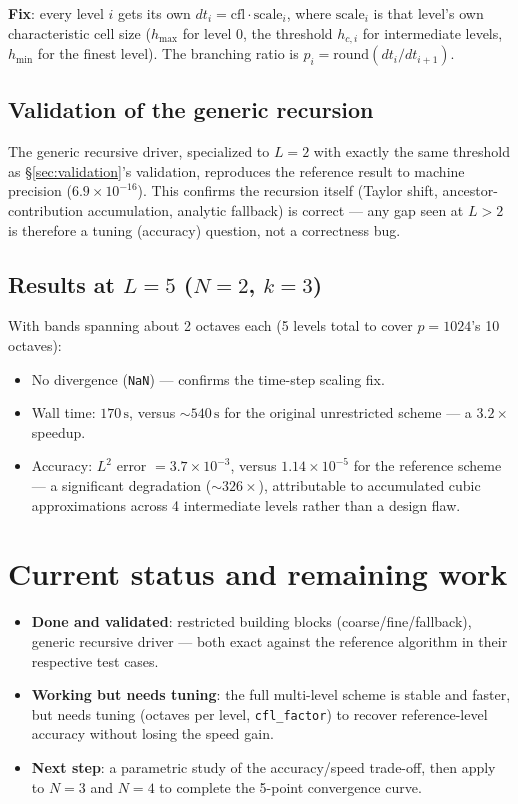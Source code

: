 \documentclass[11pt]{article}
\newcommand{\code}[1]{\texttt{#1}}
\begin{document}
\textbf{Fix}: every level $i$ gets its own $dt_i = \mathrm{cfl} \cdot
\mathrm{scale}_i$, where $\mathrm{scale}_i$ is that level's own
characteristic cell size ($h_{\max}$ for level 0, the threshold
$h_{c,i}$ for intermediate levels, $h_{\min}$ for the finest level). The
branching ratio is $p_i = \mathrm{round}(dt_i / dt_{i+1})$.

\subsection{Validation of the generic recursion}

The generic recursive driver, specialized to $L=2$ with exactly the same
threshold as \S\ref{sec:validation}'s validation, reproduces the
reference result to machine precision ($6.9\times 10^{-16}$). This
confirms the recursion itself (Taylor shift, ancestor-contribution
accumulation, analytic fallback) is correct --- any gap seen at $L>2$ is
therefore a tuning (accuracy) question, not a correctness bug.

\subsection{Results at $L=5$ ($N=2$, $k=3$)}

With bands spanning about 2 octaves each (5 levels total to cover
$p=1024$'s 10 octaves):
\begin{itemize}
  \item No divergence (\code{NaN}) --- confirms the time-step scaling
  fix.
  \item Wall time: $170\,\mathrm{s}$, versus $\sim 540\,\mathrm{s}$ for
  the original unrestricted scheme --- a $3.2\times$ speedup.
  \item Accuracy: $L^2$ error $= 3.7\times 10^{-3}$, versus
  $1.14\times 10^{-5}$ for the reference scheme --- a significant
  degradation ($\sim 326\times$), attributable to accumulated cubic
  approximations across 4 intermediate levels rather than a design flaw.
\end{itemize}

\section{Current status and remaining work}

\begin{itemize}
  \item \textbf{Done and validated}: restricted building blocks
  (coarse/fine/fallback), generic recursive driver --- both exact against
  the reference algorithm in their respective test cases.
  \item \textbf{Working but needs tuning}: the full multi-level scheme is
  stable and faster, but needs tuning (octaves per level,
  \code{cfl\_factor}) to recover reference-level accuracy without losing
  the speed gain.
  \item \textbf{Next step}: a parametric study of the accuracy/speed
  trade-off, then apply to $N=3$ and $N=4$ to complete the 5-point
  convergence curve.
\end{itemize}
\end{document}
